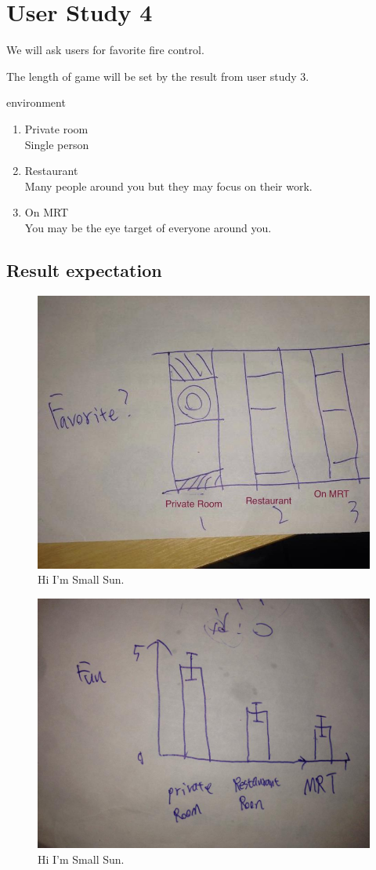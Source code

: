 \section{User Study 4}

We will ask users for favorite fire control.

The length of game will be set by the result from user study 3.


environment
\begin{enumerate}
\item Private room \\
Single person
\item Restaurant \\
Many people around you but they may focus on their work.
\item On MRT \\
You may be the eye target of everyone around you.
\end{enumerate}

\subsection{Result expectation}

\begin{figure}[!t]
\centering
\includegraphics[width=0.9\columnwidth]{Figures/US4_favoriteFire.jpg}
\caption{Hi I'm Small Sun.}
\label{fig:PS_Frus}
\end{figure}

\begin{figure}[!t]
\centering
\includegraphics[width=0.9\columnwidth]{Figures/US4_FunAndEnvironment.jpg}
\caption{Hi I'm Small Sun.}
\label{fig:PS_Frus}
\end{figure}


